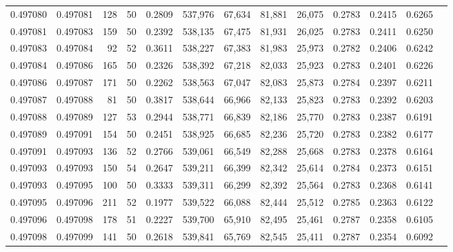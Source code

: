 \begin{tabular}{rrrrrrrrrrrrr}
0.497080 & 0.497081 &   128 &  50 &                                     0.2809 & 537,976 &  67,634 &  81,881 &  26,075 & 0.2783 & 0.2415 & 0.6265 \\
0.497081 & 0.497083 &   159 &  50 &                                     0.2392 & 538,135 &  67,475 &  81,931 &  26,025 & 0.2783 & 0.2411 & 0.6250 \\
0.497083 & 0.497084 &    92 &  52 &                                     0.3611 & 538,227 &  67,383 &  81,983 &  25,973 & 0.2782 & 0.2406 & 0.6242 \\
0.497084 & 0.497086 &   165 &  50 &                                     0.2326 & 538,392 &  67,218 &  82,033 &  25,923 & 0.2783 & 0.2401 & 0.6226 \\
0.497086 & 0.497087 &   171 &  50 &                                     0.2262 & 538,563 &  67,047 &  82,083 &  25,873 & 0.2784 & 0.2397 & 0.6211 \\
0.497087 & 0.497088 &    81 &  50 &                                     0.3817 & 538,644 &  66,966 &  82,133 &  25,823 & 0.2783 & 0.2392 & 0.6203 \\
0.497088 & 0.497089 &   127 &  53 &                                     0.2944 & 538,771 &  66,839 &  82,186 &  25,770 & 0.2783 & 0.2387 & 0.6191 \\
0.497089 & 0.497091 &   154 &  50 &                                     0.2451 & 538,925 &  66,685 &  82,236 &  25,720 & 0.2783 & 0.2382 & 0.6177 \\
0.497091 & 0.497093 &   136 &  52 &                                     0.2766 & 539,061 &  66,549 &  82,288 &  25,668 & 0.2783 & 0.2378 & 0.6164 \\
0.497093 & 0.497093 &   150 &  54 &                                     0.2647 & 539,211 &  66,399 &  82,342 &  25,614 & 0.2784 & 0.2373 & 0.6151 \\
0.497093 & 0.497095 &   100 &  50 &                                     0.3333 & 539,311 &  66,299 &  82,392 &  25,564 & 0.2783 & 0.2368 & 0.6141 \\
0.497095 & 0.497096 &   211 &  52 &                                     0.1977 & 539,522 &  66,088 &  82,444 &  25,512 & 0.2785 & 0.2363 & 0.6122 \\
0.497096 & 0.497098 &   178 &  51 &                                     0.2227 & 539,700 &  65,910 &  82,495 &  25,461 & 0.2787 & 0.2358 & 0.6105 \\
0.497098 & 0.497099 &   141 &  50 &                                     0.2618 & 539,841 &  65,769 &  82,545 &  25,411 & 0.2787 & 0.2354 & 0.6092 \\

\end{tabular}
